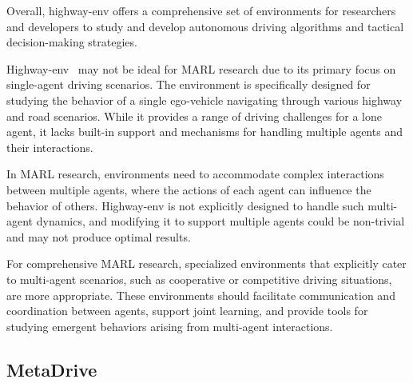 Overall, highway-env offers a comprehensive set of environments for researchers and developers to study and develop autonomous driving algorithms and tactical decision-making strategies.

Highway-env~ may not be ideal for MARL research due to its primary focus on single-agent driving scenarios. The environment is specifically designed for studying the behavior of a single ego-vehicle navigating through various highway and road scenarios. While it provides a range of driving challenges for a lone agent, it lacks built-in support and mechanisms for handling multiple agents and their interactions.

In MARL research, environments need to accommodate complex interactions between multiple agents, where the actions of each agent can influence the behavior of others. Highway-env is not explicitly designed to handle such multi-agent dynamics, and modifying it to support multiple agents could be non-trivial and may not produce optimal results.

For comprehensive MARL research, specialized environments that explicitly cater to multi-agent scenarios, such as cooperative or competitive driving situations, are more appropriate. These environments should facilitate communication and coordination between agents, support joint learning, and provide tools for studying emergent behaviors arising from multi-agent interactions.

\subsection{MetaDrive}\label{subsec:metadrive}
